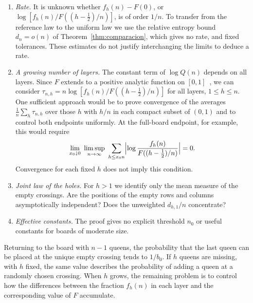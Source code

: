 \begin{enumerate}[1.] \item \emph{Rate.} It is unknown whether $f_h(n)-F(0)$, or
$\log[f_h(n)/F((h-\frac12)/n)]$, is of order $1/n$. To
transfer from the reference law to the uniform law we use the relative entropy bound $d_n=o(n)$ of
Theorem~\ref{thm:comparacion}, which
gives no rate, and fixed tolerances. These estimates do not justify interchanging the limits to deduce a
rate. \item \emph{A growing
number of
layers.} The constant term of $\log Q(n)$ depends on all layers. Since $F$ extends to a positive analytic
function on
$[0,1]$~\cite[Theorem~8.1]{Perfil}, we can consider $\tau_{n,h}=n\log[f_h(n)/F((h-\frac12)/n)]$ for all
layers, $1\le h\le n$. One
sufficient approach would be to prove convergence of the averages $\frac1n\sum_h\tau_{n,h}$ over those $h$
with $h/n$ in each compact
subset of $(0,1)$ and to control both endpoints uniformly. At the full-board endpoint, for example, this
would require \[
 \lim_{x_0\downarrow0}\ \limsup_{n\to\infty}\ \sum_{h\le x_0n}
 \Bigl|\log\frac{f_h(n)}{F((h-\frac12)/n)}\Bigr|=0 .
\] Convergence for each fixed $h$ does not imply this condition. \item \emph{Joint law of the holes.} For
$h>1$ we identify only the
mean measure of the empty crossings. Are the positions of the empty rows and columns asymptotically
independent? Does the unweighted
$d_{h,1}/n$ concentrate? \item \emph{Effective constants.} The proof gives no explicit threshold $n_0$ or
useful constants for boards
of moderate size. \end{enumerate}

Returning to the board with $n-1$ queens, the probability that the last queen can be placed at the unique
empty crossing tends to
$1/b_0$. If $h$ queens are missing, with $h$ fixed, the same value describes the probability of adding a
queen at a randomly chosen
crossing. When $h$ grows, the remaining problem is to control how the differences between the fraction
$f_h(n)$ in each layer and the
corresponding value of $F$ accumulate.
